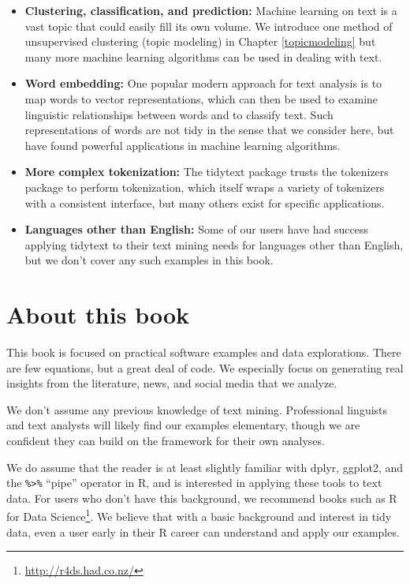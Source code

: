 \documentclass[
]{book}
\DeclareRobustCommand{\href}[2]{#2\footnote{\url{#1}}}
\providecommand{\tightlist}{%
  \setlength{\itemsep}{0pt}\setlength{\parskip}{0pt}}
\begin{document}
\begin{itemize}
\tightlist
\item
  \textbf{Clustering, classification, and prediction:} Machine learning on text is a vast topic that could easily fill its own volume. We introduce one method of unsupervised clustering (topic modeling) in Chapter \ref{topicmodeling} but many more machine learning algorithms can be used in dealing with text.
\item
  \textbf{Word embedding:} One popular modern approach for text analysis is to map words to vector representations, which can then be used to examine linguistic relationships between words and to classify text. Such representations of words are not tidy in the sense that we consider here, but have found powerful applications in machine learning algorithms.
\item
  \textbf{More complex tokenization:} The tidytext package trusts the tokenizers package \citep{R-tokenizers} to perform tokenization, which itself wraps a variety of tokenizers with a consistent interface, but many others exist for specific applications.
\item
  \textbf{Languages other than English:} Some of our users have had success applying tidytext to their text mining needs for languages other than English, but we don't cover any such examples in this book.
\end{itemize}

\hypertarget{about-this-book}{%
\section*{About this book}\label{about-this-book}}

This book is focused on practical software examples and data explorations. There are few equations, but a great deal of code. We especially focus on generating real insights from the literature, news, and social media that we analyze.

We don't assume any previous knowledge of text mining. Professional linguists and text analysts will likely find our examples elementary, though we are confident they can build on the framework for their own analyses.

We do assume that the reader is at least slightly familiar with dplyr, ggplot2, and the \texttt{\%\textgreater{}\%} ``pipe'' operator in R, and is interested in applying these tools to text data. For users who don't have this background, we recommend books such as \href{http://r4ds.had.co.nz/}{R for Data Science}. We believe that with a basic background and interest in tidy data, even a user early in their R career can understand and apply our examples.
\end{document}
